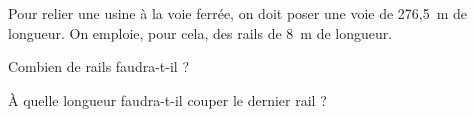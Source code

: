 Pour relier une usine à la voie ferrée, on doit poser une voie
de 276,5~m de longueur. On emploie, pour cela, des rails de 8~m
de longueur.
\begin{myenumerate}
\item Combien de rails faudra-t-il ?
\item \`A quelle longueur faudra-t-il couper le dernier rail ?
\end{myenumerate}